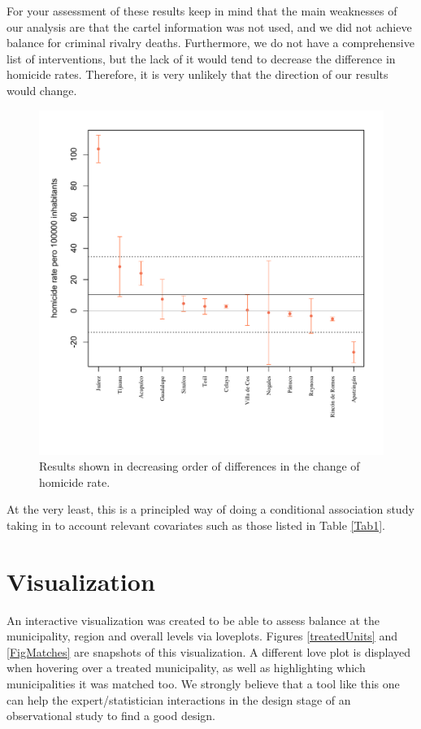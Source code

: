 \documentclass{article}[11 pt]
\begin{document}

For your assessment of these results keep in mind that the main weaknesses of our analysis are that the cartel information was not used, and we did not achieve balance for criminal rivalry deaths. Furthermore, we do not have a comprehensive list of interventions, but the lack of it would tend to decrease the difference in homicide rates. Therefore, it is very unlikely that the direction of our results would change. %
 
\begin{figure}[htdp]
	\centering
  \includegraphics[scale=0.5]{Images/results.pdf}
  \caption{Results shown in decreasing order of differences in the change of homicide rate.}
\label{figResults}
\end{figure}

At the very least, this is a principled way of doing a conditional association study taking in to account relevant covariates such as those listed in Table \ref{Tab1}.

\section{Visualization}
An interactive visualization was created to be able to assess balance at the municipality, region and overall levels via loveplots. Figures \ref{treatedUnits} and \ref{FigMatches} are snapshots of this visualization. A different love plot is displayed when hovering over a treated municipality, as well as highlighting which municipalities it was matched too. We strongly believe that a tool like this one can help the expert/statistician interactions in the design stage of an observational study to find a good design. 
\end{document}
